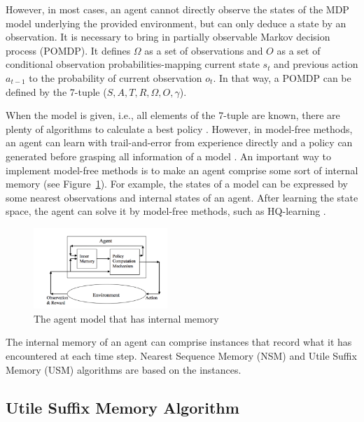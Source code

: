 \documentclass{article}
\begin{document}
However, in most cases, an agent cannot directly observe the states of the MDP
model underlying the provided environment, but can only deduce a state by an
observation. It is necessary to bring in partially observable Markov decision
process (POMDP). It defines $\Omega$ as a set of observations and $O$ as a set of
conditional observation probabilities-mapping current state $s_t$ and
previous action $a_{t-1}$ to the probability of current observation $o_t$. 
In that way, a POMDP can be defined by the 7-tuple ($S, A, T, R, \Omega, O, \gamma$).

When the model is given, i.e., all elements of the 7-tuple are known, there are
plenty of algorithms to calculate a best policy \cite{shani2013survey}. However,
in model-free methods, an agent can learn with trail-and-error from experience
directly and a policy can generated before grasping all information of a model
\cite{li2017deep}. An important way to implement model-free methods is to make
an agent comprise some sort of internal memory \cite{aberdeen2003policy,
meuleau1999learning,mccallum1995instance} (see Figure~\ref{fig:agent memory}).
For example, the states of a model can be expressed by some nearest observations
and internal states of an agent. After learning the state space, the agent can solve it by 
model-free methods, such as HQ-learning \cite{wiering1997hq}.

\begin{figure}[h]
  \centering
    \includegraphics[width=0.45\textwidth]{agent_with_memory.png}
  \caption{The agent model that has internal memory}
  \label{fig:agent memory}
\end{figure}

The internal memory of an agent can comprise instances that record what it has
encountered at each time step. Nearest Sequence Memory (NSM) and Utile
Suffix Memory (USM) algorithms are based on the instances.


\subsection{Utile Suffix Memory Algorithm}
\end{document}
